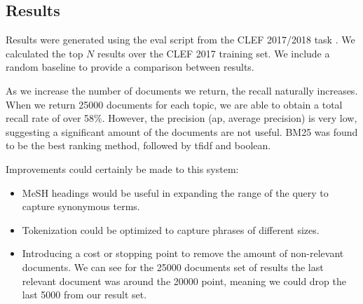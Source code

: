 \subsection{Results}

Results were generated using the eval script from the CLEF 2017/2018 task \cite{Kanoulas12017}. We calculated the top $N$ results over the CLEF 2017 training set. We include a random baseline  to provide a comparison between results.


\begin{table}[H]
\caption{Results for IR Pubmed system. Comparison for both 5000 and 25000 thresholds}
\end{table}


As we increase the number of documents we return, the recall naturally increases. When we return 25000 documents for each topic, we are able to obtain a total recall rate of over 58\%. However, the precision (ap, average precision) is very low, suggesting a significant amount of the documents are not useful. BM25 was found to be the best ranking method, followed by tfidf and boolean.

Improvements could certainly be made to this system:

\begin{itemize}
  \item MeSH headings would be useful in expanding the range of the query to capture synonymous terms. 
  \item Tokenization could be optimized to capture phrases of different sizes.
  \item Introducing a cost or stopping point to remove the amount of non-relevant documents. We can see for the 25000 documents set of results the last relevant document was around the 20000 point, meaning we could drop the last 5000 from our result set.
\end{itemize}


